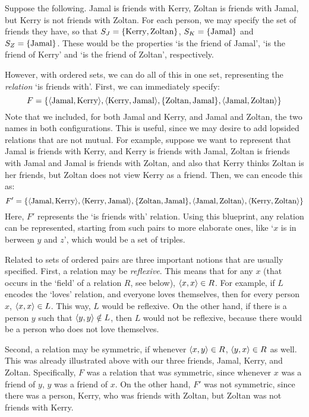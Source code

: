 Suppose the following. Jamal is friends with Kerry, Zoltan is friends with Jamal, but Kerry is not friends with Zoltan. For each person, we may specify the set of friends they have, so that $S_J=\{\text{Kerry}, \text{Zoltan}\}$, $S_K=\{\text{Jamal}\}$ and $S_Z=\{\text{Jamal}\}$. These would be the properties `is the friend of Jamal', `is the friend of Kerry' and `is the friend of Zoltan', respectively. 

However, with ordered sets, we can do all of this in one set, representing the \textit{relation} `is friends with'. First, we can immediately specify: 
%
\[F=\{\langle\text{Jamal}, \text{Kerry}\rangle, \langle\text{Kerry}, \text{Jamal}\rangle, \{\text{Zoltan}, \text{Jamal}\}, \langle\text{Jamal}, \text{Zoltan}\rangle\}\]
%
Note that we included, for both Jamal and Kerry, and Jamal and Zoltan, the two names in both configurations. This is useful, since we may desire to add lopsided relations that are not mutual. For example, suppose we want to represent that Jamal is friends with Kerry, and Kerry is friends with Jamal, Zoltan is friends with Jamal and Jamal is friends with Zoltan, and also that Kerry thinks Zoltan is her friends, but Zoltan does not view Kerry as a friend. Then, we can encode this as: 
%
\[F'=\{\langle\text{Jamal}, \text{Kerry}\rangle, \langle\text{Kerry}, \text{Jamal}\rangle, \{\text{Zoltan}, \text{Jamal}\}, \langle\text{Jamal}, \text{Zoltan}\rangle, \langle\text{Kerry}, \text{Zoltan}\rangle\}\]
%
Here, $F'$ represents the `is friends with' relation. Using this blueprint, any relation can be represented, starting from such pairs to more elaborate ones, like `$x$ is in berween $y$ and $z$', which would be a set of triples. 

Related to sets of ordered pairs are three important notions that are usually specified. First, a relation may be \textit{reflexive}. This means that for any $x$ (that occurs in the `field' of a relation $R$, see below), $\langle x, x\rangle \in R$. For example, if $L$ encodes the `loves' relation, and everyone loves themselves, then for every person $x$, $\langle x, x\rangle \in L$. This way, $L$ would be reflexive. On the other hand, if there is a person $y$ such that $\langle y, y\rangle \notin L$, then $L$ would not be reflexive, because there would be a person who does not love themselves. 

Second, a relation may be symmetric, if whenever $\langle x, y\rangle \in R$, $\langle y, x\rangle \in R$ as well. This was already illustrated above with our three friends, Jamal, Kerry, and Zoltan. Specifically, $F$ was a relation that was symmetric, since whenever $x$ was a friend of $y$, $y$ was a friend of $x$. On the other hand, $F'$ was not symmetric, since there was a person, Kerry, who was friends with Zoltan, but Zoltan was not friends with Kerry. 


